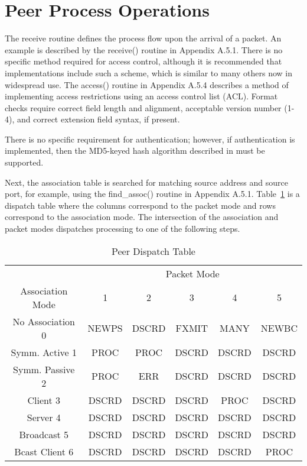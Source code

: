 \section{Peer Process Operations}
\label{section-9-2}

The receive routine defines the process flow upon the arrival of a
packet. An example is described by the receive() routine in
Appendix A.5.1. There is no specific method required for access
control, although it is recommended that implementations include such
a scheme, which is similar to many others now in widespread use. The
access() routine in Appendix A.5.4 describes a method of implementing
access restrictions using an access control list (ACL). Format
checks require correct field length and alignment, acceptable version
number (1-4), and correct extension field syntax, if present.

There is no specific requirement for authentication; however, if
authentication is implemented, then the MD5-keyed hash algorithm
described in \cite{RFC1321} must be supported.

Next, the association table is searched for matching source address
and source port, for example, using the find\_assoc() routine in
Appendix A.5.1. Table~\ref{peer_dispatch_table} is a dispatch table where the columns
correspond to the packet mode and rows correspond to the association
mode. The intersection of the association and packet modes
dispatches processing to one of the following steps.

\begin{table}[htb]
\center
\begin{tabular}{c | c | c | c | c | c}
 & \multicolumn{5}{c}{Packet Mode} \\
Association Mode & 1 & 2 & 3 & 4 & 5 \\
\hline
\hline
No Association 0 & NEWPS & DSCRD & FXMIT & MANY & NEWBC \\
Symm. Active 1 & PROC & PROC & DSCRD & DSCRD & DSCRD \\
Symm. Passive 2 & PROC & ERR & DSCRD & DSCRD & DSCRD \\
Client 3 & DSCRD & DSCRD & DSCRD & PROC & DSCRD \\
Server 4 & DSCRD & DSCRD & DSCRD & DSCRD & DSCRD \\
Broadcast 5 & DSCRD & DSCRD & DSCRD & DSCRD & DSCRD \\
Bcast Client 6 & DSCRD & DSCRD & DSCRD & DSCRD & PROC \\
\hline
\end{tabular}
\label{peer_dispatch_table}
\caption{Peer Dispatch Table}
\end{table}

